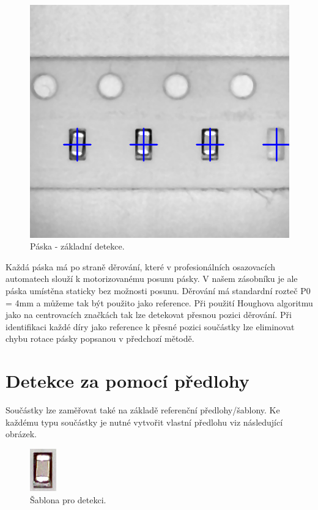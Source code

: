 \begin{figure}[h!]
  \centering
    \includegraphics[width=0.5\linewidth]{obrazky/res1.png}%
    \caption{Páska - základní detekce.}
    \label{fig:tape2}
\end{figure}

Každá páska má po straně děrování, které v profesionálních osazovacích automatech slouží k motorizovanému posunu pásky. V našem zásobníku je ale páska umístěna staticky bez možnosti posunu. Děrování má standardní rozteč P0 = 4mm a můžeme tak být použito jako reference. Při použití Houghova algoritmu jako na centrovacích značkách tak lze detekovat přesnou pozici děrování. Při identifikaci každé díry jako reference k přesné pozici součástky lze eliminovat chybu rotace pásky popsanou v předchozí mětodě.

\section{Detekce za pomocí předlohy} \label{template}


Součástky lze zaměřovat také na základě referenční předlohy/šablony. Ke každému typu součástky je nutné vytvořit vlastní předlohu viz následující obrázek.

\begin{figure}[h!]
  \centering
    \includegraphics[width=0.1\linewidth]{obrazky/template.png}%
    \caption{Šablona pro detekci.}
    \label{fig:template}
\end{figure}

